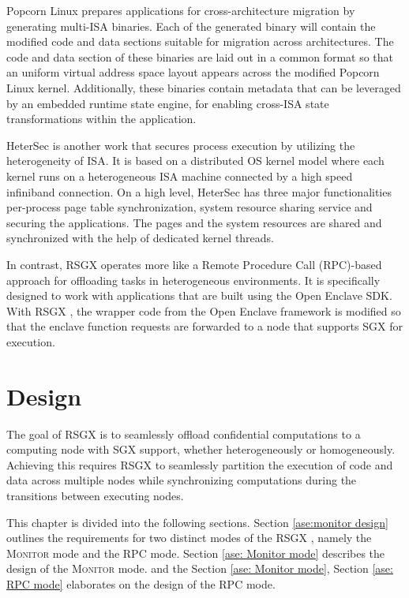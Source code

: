 \documentclass[article, doublespace,nopageskip]{VTthesis} %
\newcommand{\monitor}{RSGX \xspace}
\begin{document}
    Popcorn Linux \cite{het_isa_migrate:asplos12} prepares applications for cross-architecture migration by generating multi-ISA binaries. Each of the generated binary will contain the modified code and data sections suitable for migration across architectures. The code and data section of these binaries are laid out in a common format so that an uniform virtual address space layout appears across the modified Popcorn Linux kernel. Additionally, these binaries contain metadata that can be leveraged by an embedded runtime state engine, for enabling cross-ISA state transformations within the application.  

    HeterSec \cite{HeterSec} is another work that secures process execution by utilizing the heterogeneity of ISA. It is based on a distributed OS kernel model where each kernel runs on a heterogeneous ISA machine connected by a high speed infiniband connection. On a high level, HeterSec has three major functionalities per-process page table synchronization, system resource sharing service and securing the applications. The pages and the system resources are shared and synchronized with the help of dedicated kernel threads. 
    
    In contrast, \monitor operates more like a Remote Procedure Call (RPC)-based approach for offloading tasks in heterogeneous environments. It is specifically designed to work with applications that are built using the Open Enclave SDK. With \monitor, the wrapper code from the Open Enclave framework is modified so that the enclave function requests are forwarded to a node that supports SGX for execution.

    \chapter{Design} \label{ch:design}
    
    The goal of \monitor is to seamlessly offload confidential computations to a computing node with SGX support, whether heterogeneously or homogeneously. Achieving this requires \monitor to seamlessly partition the execution of code and data across multiple nodes while synchronizing computations during the transitions between executing nodes.

    This chapter is divided into the following sections. Section \ref{ase:monitor design} outlines the requirements for two distinct modes of the \monitor, namely the \textsc{Monitor} mode and the \textsc{RPC} mode. Section \ref{ase: Monitor mode} describes the design of the \textsc{Monitor} mode. and the Section \ref{ase: Monitor mode}, Section \ref{ase: RPC mode} elaborates on the design of the \textsc{RPC} mode.
\end{document}
